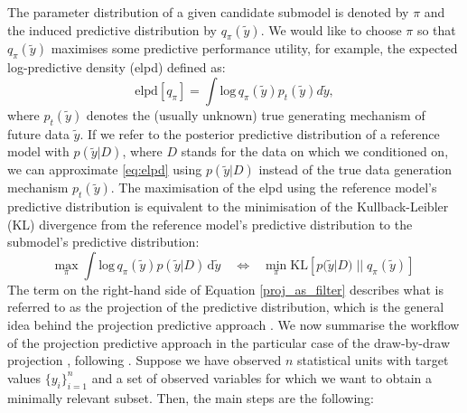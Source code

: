 \documentclass[a4]{article}
\theoremstyle{definition}
\begin{document}
The parameter
distribution of a given candidate submodel is denoted by $\pi$ and the induced predictive
distribution by $q_{\pi}(\tilde{y})$. We would like to choose $\pi$ so
that $q_{\pi}(\tilde{y})$ maximises some predictive performance
utility, for example, the expected log-predictive density (elpd)
defined as: \
\begin{equation}\label{eq:elpd}
\text{elpd}[q_{\pi}]=\int \text{log}\,q_{\pi}(\tilde{y})p_{t}(\tilde{y})d\tilde{y},
\end{equation}
where $p_{t}(\tilde{y})$ denotes the (usually unknown) true generating
mechanism of future data $\tilde{y}$. If we refer to the posterior
predictive distribution of a reference model with $p(\tilde{y}|D)$,
where $D$ stands for the data on which we conditioned on, we can
approximate \eqref{eq:elpd} using $p(\tilde{y}|D)$ instead of the true
data generation mechanism $p_{t}(\tilde{y})$. The maximisation of the
elpd using the reference model's predictive distribution is equivalent
to the minimisation of the Kullback-Leibler (KL) divergence from the
reference model's predictive distribution to the submodel's predictive
distribution: \
\begin{equation} \label{proj_as_filter}
\underset{\pi}{\text{max}} \; \int \text{log}\,q_{\pi}(\tilde{y})p(\tilde{y}|D)
\, \text{d} \tilde{y} 
\quad \Leftrightarrow \quad 
\underset{\pi}{\text{min}} \; \text{KL}[p(\tilde{y}|D) \; || \; q_{\pi}(\tilde{y})] 
\end{equation}
The term on the right-hand side of Equation \eqref{proj_as_filter}
describes what is referred to as the projection of the predictive
distribution, which is the general idea behind the projection
predictive approach \cite[see][]{paper:projpred}. 
We now summarise the workflow of the projection predictive approach in
the particular case of the draw-by-draw projection \cite[original
formulation by][]{paper:original_proj}, following
\cite{paper:projpred}. Suppose we have observed $n$ statistical units
with target values $\{y_{i}\}_{i=1}^{n}$ and a set of observed
variables for which we want to obtain a minimally relevant
subset. Then, the main steps are the following:
\end{document}

